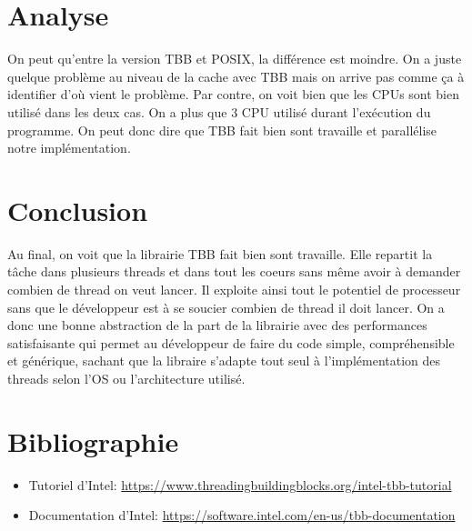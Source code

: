 \documentclass[10pt,a4paper]{article}
\begin{document}
\section{Analyse}
On peut qu'entre la version TBB et POSIX, la différence est moindre. On a juste quelque problème au niveau de la cache avec TBB mais on arrive pas comme ça à identifier d'où vient le problème. Par contre, on voit bien que les CPUs sont bien utilisé dans les deux cas. On a plus que 3 CPU utilisé durant l’exécution du programme. On peut donc dire que TBB fait bien sont travaille et parallélise notre implémentation.

\section{Conclusion}
Au final, on voit que la librairie TBB fait bien sont travaille. Elle repartit la tâche dans plusieurs threads et dans tout les coeurs sans même avoir à demander combien de thread on veut lancer. Il exploite ainsi tout le potentiel de processeur sans que le développeur est à se soucier combien de thread il doit lancer. On a donc une bonne abstraction de la part de la librairie avec des performances satisfaisante qui permet au développeur de faire du code simple, compréhensible et générique, sachant que la libraire s'adapte tout seul à l'implémentation des threads selon l'OS ou l'architecture utilisé.

\section{Bibliographie}
\begin{itemize}
	\item Tutoriel d'Intel: \url{https://www.threadingbuildingblocks.org/intel-tbb-tutorial}
	\item Documentation d'Intel: \url{https://software.intel.com/en-us/tbb-documentation}
\end{itemize}
\end{document}
